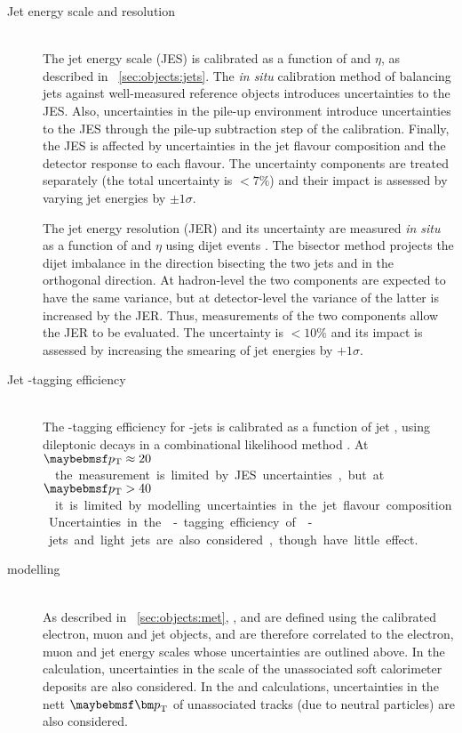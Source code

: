 \begin{description}
\item[Jet energy scale and resolution] \hfill \\
	The jet energy scale (JES) is calibrated as a function of \pt and $\eta$, as described 
	in \Section~\ref{sec:objects:jets}. The \textit{in situ} calibration method of balancing 
	jets against well-measured reference objects introduces uncertainties to the JES. Also, 
	uncertainties in the pile-up environment introduce uncertainties to the JES through the 
	pile-up subtraction step of the calibration. Finally, the JES is affected by 
	uncertainties in the jet flavour composition and the detector response to each flavour.
	The uncertainty components are treated separately (the total uncertainty is $<\!7\%$) 
	and their impact is assessed by varying jet energies by $\pm1\sigma$.

	The jet energy resolution (JER) and its uncertainty are measured \textit{in situ} as a 
	function of \pt and $\eta$ using dijet events \cite{Jets:JER:2011}. The bisector method 
	projects the dijet \pt imbalance in the direction bisecting the two jets and in the 
	orthogonal direction. At hadron-level the two components are expected to have the same 
	variance, but at detector-level the variance of the latter is increased by the JER.
	Thus, measurements of the two components allow the JER to be evaluated. The uncertainty 
	is $<\!10\%$ and its impact is assessed by increasing the smearing of jet energies 
	by $+1\sigma$.

\item[Jet \Pbottom-tagging efficiency] \hfill \\
	The \Pbottom-tagging efficiency for \Pbottom-jets is calibrated as a function of jet 
	\pt, using dileptonic \ttbar decays in a combinational likelihood method \cite{Btag:llh}.
	At \unit{$\pt \approx 20$}{\GeV} the measurement is limited by JES uncertainties, but at 
	\unit{$\pt > 40$}{\GeV} it is limited by modelling uncertainties in the jet flavour 
	composition. Uncertainties in the \Pbottom-tagging efficiency of \Pcharm-jets and light 
	jets are also considered, though have little effect.

\item[\met modelling] \hfill \\
	As described in \Section~\ref{sec:objects:met}, \calomet, \trackmet and \corrtrackmet 
	are defined using the calibrated electron, muon and jet objects, and are therefore 
	correlated to the electron, muon and jet energy scales whose uncertainties are outlined 
	above. In the \calomet calculation, uncertainties in the scale of the unassociated soft 
	calorimeter deposits are also considered. In the \trackmet and \corrtrackmet 
	calculations, uncertainties in the nett $\bvec{p}_{\text{T}}$ of unassociated tracks 
	(\eg due to neutral particles) are also considered.


\end{description}
